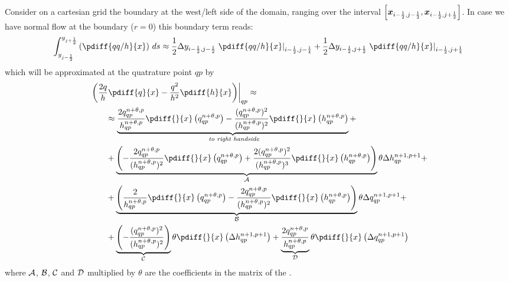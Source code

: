 Consider on a cartesian grid the boundary at the west/left side of the domain, ranging over the interval $\left[ \bm{x}_{i-\frac{1}{2}, j-\frac{1}{2}}, \bm{x}_{i-\frac{1}{2}, j+\frac{1}{2}} \right]$.
In case we have normal flow at the boundary ($r=0$) this boundary term reads:
\begin{align}
    \int^{y_{j+\half}}_{y_{j-\half}}\left(
    \pdiff{qq/h}{x}
    \right) \, ds \approx
    \half\Dy_{i-\half, j-\half}\left.\pdiff{qq/h}{x}\right|_{i-\half, j-\quart} + \half \Dy_{i-\half, j+\half}\left.\pdiff{qq/h}{x}\right|_{i-\half, j+\quart}
\end{align}
which will be approximated at the quatrature point $qp$ by
\begin{align}
    & \left. \left( \frac{2q}{h}\pdiff{q}{x} - \frac{q^2}{h^2}\pdiff{h}{x}\right) \right|_{qp}
    \approx
    \\
    & \qquad \approx \underbrace{\frac{2q^{n+\theta, p}_{qp}}{ h^{n+\theta, p}_{qp}} \pdiff{}{x}\left( q^{n+\theta, p}_{qp} \right)
        - \frac{(q^{n+\theta, p}_{qp})^2}{(h^{n+\theta, p}_{qp})^2} \pdiff{}{x} \left( h^{n+\theta, p}_{qp} \right)}_{\textit{ to right handside}} +
    \nonumber \\
    & \qquad + \underbrace{\left( -\frac{2q^{n+\theta, p}_{qp}}{ (h^{n+\theta, p}_{qp})^2}  \pdiff{}{x} \left( q^{n+\theta,p}_{qp}  \right)
        + \frac{2(q^{n+\theta, p}_{qp})^2}{(h^{n+\theta, p}_{qp})^3} \pdiff{}{x} \left( h^{n+\theta,p} _{qp} \right)
        \right)}_{\cal A} \theta \Delta h^{n+1, p+1}_{qp} +
    \nonumber \\
    & \qquad + \underbrace{\left( \frac{2}{ h^{n+\theta, p}_{qp}} \pdiff{}{x} \left( q^{n+\theta, p}_{qp} \right)
        -  \frac{2q^{n+\theta, p}_{qp}}{(h^{n+\theta, p}_{qp})^2} \pdiff{}{x} \left( h^{n+\theta, p}_{qp} \right)
        \right)}_{\cal B} \theta \Delta q^{n+1, p+1}_{qp} +
    \nonumber \\
    &
    \qquad + \underbrace{\left(- \frac{(q^{n+\theta, p}_{qp})^2}{(h^{n+\theta, p}_{qp})^2} \right)}_{\cal C} \theta \pdiff{}{x} \left( \Delta h^{n+1, p+1}_{qp} \right)
    + \underbrace{\frac{2q^{n+\theta, p}_{qp}}{ h^{n+\theta, p}_{qp}}}_{\cal D} \theta \pdiff{}{x} \left(  \Delta q^{n+1, p+1}_{qp} \right)
\end{align}
where $\cal{A}$, $\cal{B}$, $\cal{C}$ and $\cal{D}$ multiplied by $\theta$ are the coefficients in the matrix of the \deltaformulation.

